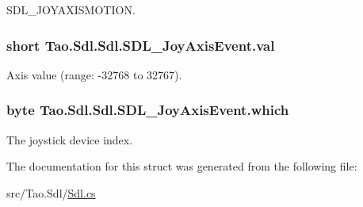 SDL\_\-JOYAXISMOTION. 

\hypertarget{struct_tao_1_1_sdl_1_1_sdl_1_1_s_d_l___joy_axis_event_a33ccbbcde34a6c14aa27f1eed7851dc1}{
\subsubsection[{val}]{\setlength{\rightskip}{0pt plus 5cm}short {\bf Tao.Sdl.Sdl.SDL\_\-JoyAxisEvent.val}}}
\label{struct_tao_1_1_sdl_1_1_sdl_1_1_s_d_l___joy_axis_event_a33ccbbcde34a6c14aa27f1eed7851dc1}


Axis value (range: -\/32768 to 32767). 

\hypertarget{struct_tao_1_1_sdl_1_1_sdl_1_1_s_d_l___joy_axis_event_acba47760d8072344474515532a6841c1}{
\subsubsection[{which}]{\setlength{\rightskip}{0pt plus 5cm}byte {\bf Tao.Sdl.Sdl.SDL\_\-JoyAxisEvent.which}}}
\label{struct_tao_1_1_sdl_1_1_sdl_1_1_s_d_l___joy_axis_event_acba47760d8072344474515532a6841c1}


The joystick device index. 



The documentation for this struct was generated from the following file:\begin{DoxyCompactItemize}
\item 
src/Tao.Sdl/\hyperlink{_sdl_8cs}{Sdl.cs}\end{DoxyCompactItemize}
